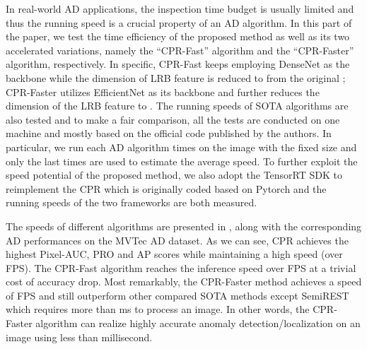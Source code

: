 \documentclass[lettersize,journal]{IEEEtran}
\begin{document}
In real-world AD applications, the inspection time budget is usually limited and thus the
running speed is a crucial property of an AD algorithm. In this part of the paper, we test
the time efficiency of the proposed method as well as its two accelerated variations,
namely the ``CPR-Fast'' algorithm and the ``CPR-Faster'' algorithm, respectively. In
specific, CPR-Fast keeps employing DenseNet as the backbone while the dimension of
LRB feature is reduced to  from the original ; CPR-Faster utilizes EfficientNet
\cite{tan2020efficientnet} as its backbone and further reduces the dimension of the LRB feature to .
The running speeds of  SOTA algorithms are also tested and to make a fair comparison,
all the tests are conducted on one machine and mostly based on the official code
published by the authors. In particular, we run each AD algorithm  times on the
image with the fixed size  and only the last  times are used to
estimate the average speed. To further exploit the speed potential of the proposed method, we
also adopt the TensorRT SDK \cite{migacz20178} to reimplement the CPR which is originally coded based
on Pytorch \cite{paszke2019pytorch} and the running speeds of the two frameworks are both measured.

The speeds of different algorithms are presented in , along with the
corresponding AD performances on the MVTec AD dataset. As we can see, CPR achieves the
highest Pixel-AUC, PRO and AP scores while maintaining a high speed (over  FPS). The
CPR-Fast algorithm reaches the inference speed over  FPS at a trivial cost of accuracy
drop.  Most remarkably, the CPR-Faster method achieves a speed of  FPS and still
outperform other compared SOTA methods except SemiREST \cite{li2023efficient} which requires more than  ms to process an image. In other words, the CPR-Faster algorithm can
realize highly accurate anomaly detection/localization on an image using less than 
millisecond.
\end{document}

